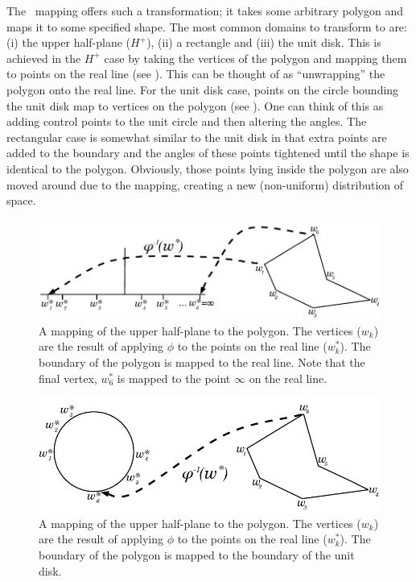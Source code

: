 The \sch\ mapping offers such a transformation; it takes some arbitrary polygon and maps it to some specified shape. The most common domains to transform to are: (i) the upper half-plane ($H^+$), (ii) a rectangle and (iii) the unit disk. This is achieved in the $H^+$ case by taking the vertices of the polygon and mapping them to points on the real line (see ). This can be thought of as ``unwrapping'' the polygon onto the real line. For the unit disk case, points on the circle bounding the unit disk map to vertices on the polygon (see ). One can think of this as adding control points to the unit circle and then altering the angles. The rectangular case is somewhat similar to the unit disk in that extra points are added to the boundary and the angles of these points tightened until the shape is identical to the polygon. Obviously, those points lying inside the polygon are also moved around due to the mapping, creating a new (non-uniform) distribution of space.

\begin{figure} [tbp]
\centering
\includegraphics[scale=0.6]{sc/figs/reallinedia.pdf}
\caption{A mapping of the upper half-plane to the polygon. The vertices ($w_k$) are the result of applying $\phi$ to the points on the real line ($w^*_k$). The boundary of the polygon is mapped to the real line. Note that the final vertex, $w^*_6$ is mapped to the point $\infty$ on the real line.}
\label{reallinedia}
\end{figure}

\begin{figure} [tbp]
\centering
\includegraphics[scale=0.6]{sc/figs/unitdiskdia.pdf}
\caption{A mapping of the upper half-plane to the polygon. The vertices ($w_k$) are the result of applying $\phi$ to the points on the real line ($w^*_k$). The boundary of the polygon is mapped to the boundary of the unit disk.}
\label{unitdiskdia}
\end{figure}

